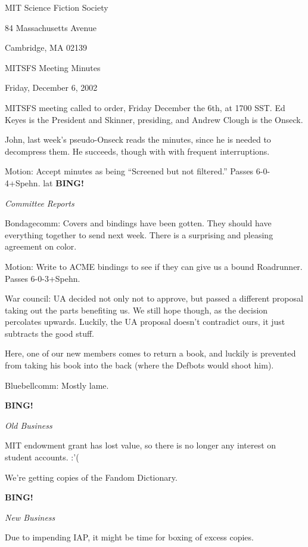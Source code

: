 \documentclass[12pt]{article}
\newcommand{\bing}{{\bf BING!} }
\newcommand{\goto}[1]{\bing \vskip 12pt \centerline{{\em{#1}}}}
\begin{document}
\begin{center}

MIT Science Fiction Society 

84 Massachusetts Avenue

Cambridge, MA 02139

\vspace{12pt}

MITSFS Meeting Minutes 

Friday, December 6, 2002

\end{center}

\vspace{18pt}

\setlength{\parskip}{6pt}

MITSFS meeting called to order, Friday December the 6th, at 1700 SST.  Ed Keyes is the President and Skinner, presiding, and Andrew Clough is the Onseck.

John, last week's pseudo-Onseck reads the minutes, since he is needed to decompress them.  He succeeds, though with with frequent interruptions.

Motion: Accept minutes as being ``Screened but not filtered.''  Passes 6-0-4+Spehn.
lat
\goto{Committee Reports}

Bondagecomm:  Covers and bindings have been gotten.  They should have everything together to send next week.  There is a surprising and pleasing agreement on color.

Motion:  Write to ACME bindings to see if they can give us a bound Roadrunner.  Passes 6-0-3+Spehn.

War council:  UA decided not only not to approve, but passed a different proposal taking out the parts benefiting us.  We still hope though, as the decision percolates upwards.  Luckily, the UA proposal doesn't contradict ours, it just subtracts the good stuff.

Here, one of our new members comes to return a book, and luckily is prevented from taking his book into the back (where the Defbots would shoot him).

Bluebellcomm:  Mostly lame.

\goto{Old Business}

MIT endowment grant has lost value, so there is no longer any interest on student accounts. :'(

We're getting copies of the Fandom Dictionary.

\goto{New Business}

Due to impending IAP, it might be time for boxing of excess copies.
\end{document}
